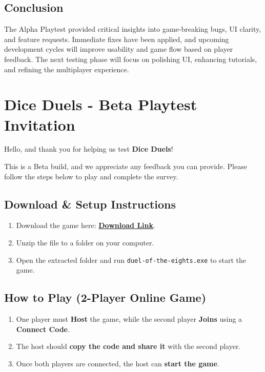 \documentclass{article}
\begin{document}
\subsection{Conclusion}
The Alpha Playtest provided critical insights into game-breaking bugs, UI clarity, and feature requests. Immediate fixes have been applied, and upcoming development cycles will improve usability and game flow based on player feedback. The next testing phase will focus on polishing UI, enhancing tutorials, and refining the multiplayer experience.



\newpage

\section{Dice Duels - Beta Playtest Invitation}

Hello, and thank you for helping us test \textbf{Dice Duels}!

This is a Beta build, and we appreciate any feedback you can provide. Please follow the steps below to play and complete the survey.

\subsection{Download \& Setup Instructions}
\begin{enumerate}
    \item Download the game here: \href{https://drive.google.com/file/d/1MLTZWqBBJjXCT3Q7cvJJVNfackxiZBBO/view?usp=sharing}{\textbf{Download Link}}.
    \item Unzip the file to a folder on your computer.
    \item Open the extracted folder and run \texttt{duel-of-the-eights.exe} to start the game.
\end{enumerate}

\subsection{How to Play (2-Player Online Game)}
\begin{enumerate}
    \item One player must \textbf{Host} the game, while the second player \textbf{Joins} using a \textbf{Connect Code}.
    \item The host should \textbf{copy the code and share it} with the second player.
    \item Once both players are connected, the host can \textbf{start the game}.
\end{enumerate}
\end{document}
